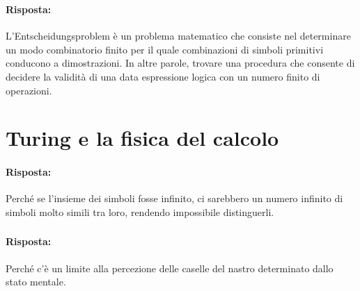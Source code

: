 \subsubsection{}


\paragraph{Risposta:} L'Entscheidungsproblem è un problema matematico che consiste nel determinare
un modo combinatorio finito per il quale combinazioni di simboli primitivi conducono a dimostrazioni.
In altre parole, trovare una procedura che consente di decidere la validità di una data
espressione logica con un numero finito di operazioni.

\section{Turing e la fisica del calcolo}


\paragraph{Risposta:} Perché se l'insieme dei simboli fosse infinito, ci sarebbero un numero infinito di 
simboli molto simili tra loro, rendendo impossibile distinguerli.

\subsubsection{}


\paragraph{Risposta:} Perché c'è un limite alla percezione delle caselle del nastro determinato dallo stato mentale.

\subsubsection{}

